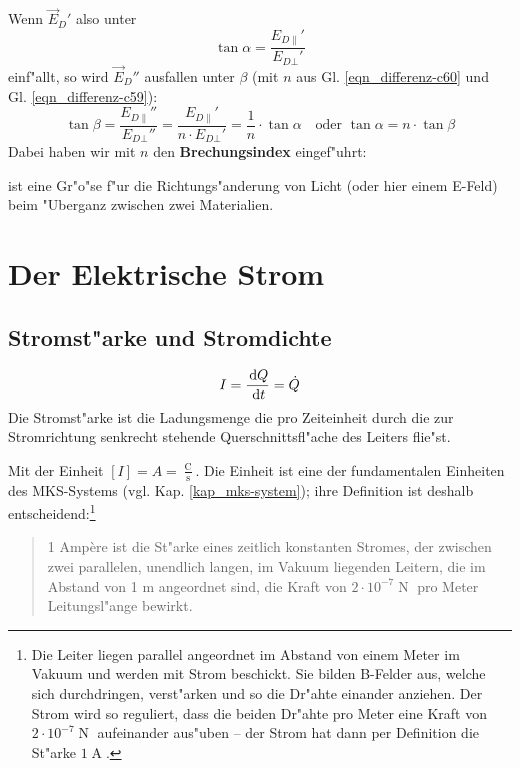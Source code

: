 Wenn $\vec E_D'$ also unter
\begin{equation*}
\tan \alpha =  \frac{E_{D \|}'}{E_{D \bot}'}
\end{equation*}
einf"allt, so wird $\vec E_D''$ ausfallen unter $\beta$ (mit $n$ aus
Gl. \eqref{eqn_differenz-c60} und Gl. \eqref{eqn_differenz-c59}):
\begin{equation*}
   \tan \beta =
 \frac{E_{D \|}''}{E_{D \bot}''}
=
 \frac{E_{D \|}'}{n \cdot E_{D \bot}'}
=
\frac{1}{n} \cdot \tan \alpha
\text{ ~ oder } \boxed{  \tan \alpha = n \cdot \tan \beta }
\end{equation*}
Dabei haben wir mit $n$ den
\textbf{Brechungsindex} eingef"uhrt:
\begin{Def}
    ist eine Gr"o"se f"ur die
   Richtungs"anderung von Licht (oder hier einem E-Feld) beim "Uberganz
   zwischen zwei Materialien.
\end{Def}













\section{Der Elektrische Strom}
\label{kap_elektrische-strom}

\subsection{Stromst"arke und Stromdichte}
\label{kap_stromstarke-und-stromdichte}

\begin{Def}
   \begin{equation}
      \label{eqn_differenz-c61}
      I = \frac{\, \mathrm{d} Q}{\, \mathrm{d} t} = \dot Q
   \end{equation}
Die Stromst"arke ist die Ladungsmenge die pro Zeiteinheit durch die zur
Stromrichtung senkrecht stehende Querschnittsfl"ache des Leiters flie"st.
\end{Def}
Mit der Einheit $[I] = A = \frac{\operatorname{C}}{\operatorname{s}}$.
Die Einheit ist eine der fundamentalen Einheiten des
MKS-Systems (vgl. Kap. \ref{kap_mks-system}); ihre
Definition ist deshalb entscheidend:\footnote{Die Leiter liegen
  parallel angeordnet im Abstand von einem Meter im Vakuum und werden
  mit Strom beschickt. Sie bilden B-Felder aus, welche sich
  durchdringen, verst"arken und so die Dr"ahte einander anziehen. Der
  Strom wird so reguliert, dass die beiden Dr"ahte pro Meter eine
  Kraft von $2\cdot 10^{-7}\operatorname{N}$ aufeinander aus"uben --
  der Strom hat dann per Definition die St"arke $1\operatorname{A}$.}
\begin{quote}
   1 Amp\`ere ist die St"arke eines zeitlich
   konstanten Stromes, der zwischen zwei parallelen, unendlich langen,
   im Vakuum liegenden Leitern, die im Abstand von 1 m angeordnet
   sind, die Kraft von $2 \cdot 10^{-7} \operatorname{N}$ pro Meter
   Leitungsl"ange bewirkt.
\end{quote}

